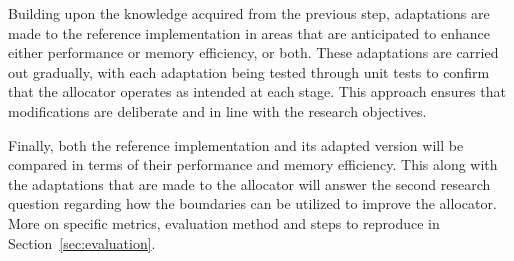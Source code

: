 Building upon the knowledge acquired from the previous step, adaptations are made to the reference implementation in areas that are anticipated to enhance either performance or memory efficiency, or both. These adaptations are carried out gradually, with each adaptation being tested through unit tests to confirm that the allocator operates as intended at each stage. This approach ensures that modifications are deliberate and in line with the research objectives.

Finally, both the reference implementation and its adapted version will be compared in terms of their performance and memory efficiency. This along with the adaptations that are made to the allocator will answer the second research question regarding how the boundaries can be utilized to improve the allocator. More on specific metrics, evaluation method and steps to reproduce in Section~\ref{sec:evaluation}.

